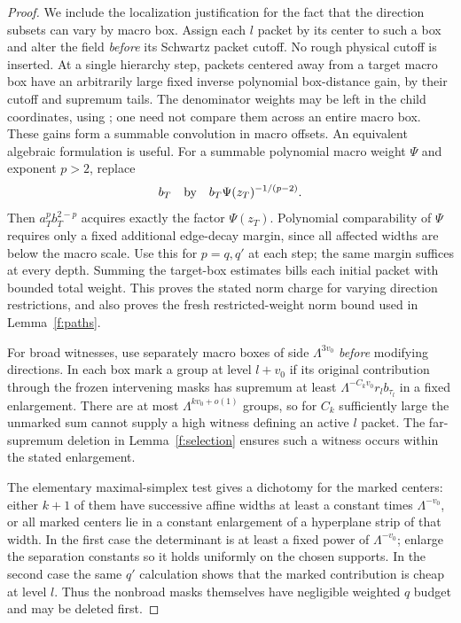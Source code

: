 \begin{proof}
We include the localization justification for the fact that the
direction subsets can vary by macro box. Assign each $l$ packet by
its center to such a box and alter the field \emph{before} its
Schwartz packet cutoff. No rough physical cutoff is inserted.
At a single hierarchy step, packets centered away from a target
macro box have an arbitrarily large fixed inverse polynomial
box-distance gain, by their cutoff and supremum tails. The
denominator weights may be left in the child coordinates, using
; one need not compare them across an entire
macro box. These gains form a summable convolution in macro offsets.
An equivalent algebraic formulation is useful. For a summable
polynomial macro weight $\Psi$ and exponent $p>2$, replace
\[
 b_T\quad\hbox{by}\quad b_T\Psi(z_T)^{-1/(p-2)}.
\]
Then $a_T^pb_T^{2-p}$ acquires exactly the factor $\Psi(z_T)$.
Polynomial comparability of $\Psi$ requires only a fixed additional
edge-decay margin, since all affected widths are below the macro
scale. Use this for $p=q,q'$ at each step; the same margin suffices
at every depth. Summing the target-box estimates bills each initial
packet with bounded total weight. This proves the stated norm
charge for varying direction restrictions, and also proves the
fresh restricted-weight norm bound used in Lemma~\ref{f:paths}.

For broad witnesses, use separately macro boxes of side
$\Lambda^{3v_0}$ \emph{before} modifying directions. In each box
mark a group at level $l+v_0$ if its original contribution through
the frozen intervening masks has supremum at least
$\Lambda^{-C_kv_0}r_lb_{\tau_l}$ in a fixed enlargement. There are
at most $\Lambda^{kv_0+o(1)}$ groups, so for $C_k$ sufficiently large
the unmarked sum cannot supply a high witness defining an active
$l$ packet. The far-supremum deletion in Lemma~\ref{f:selection}
ensures such a witness occurs within the stated enlargement.

The elementary maximal-simplex test gives a dichotomy for the marked
centers: either $k+1$ of them have successive affine widths at least
a constant times $\Lambda^{-v_0}$, or all marked centers lie in a
constant enlargement of a hyperplane strip of that width. In the
first case the determinant is at least a fixed power of
$\Lambda^{-v_0}$; enlarge the separation constants so it holds
uniformly on the chosen supports. In the second case the same
$q'$ calculation shows that the marked contribution is cheap at
level $l$. Thus the nonbroad masks themselves have negligible
weighted $q$ budget and may be deleted first.


\end{proof}
